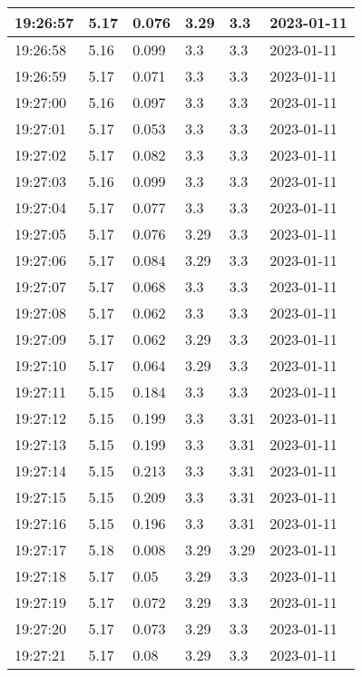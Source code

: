 \begin{longtable}{|l|l|l|l|l|l|}
        19:26:57 & 5.17 & 0.076 & 3.29 & 3.3 & 2023-01-11 \\ \hline
        19:26:58 & 5.16 & 0.099 & 3.3 & 3.3 & 2023-01-11 \\ \hline
        19:26:59 & 5.17 & 0.071 & 3.3 & 3.3 & 2023-01-11 \\ \hline
        19:27:00 & 5.16 & 0.097 & 3.3 & 3.3 & 2023-01-11 \\ \hline
        19:27:01 & 5.17 & 0.053 & 3.3 & 3.3 & 2023-01-11 \\ \hline
        19:27:02 & 5.17 & 0.082 & 3.3 & 3.3 & 2023-01-11 \\ \hline
        19:27:03 & 5.16 & 0.099 & 3.3 & 3.3 & 2023-01-11 \\ \hline
        19:27:04 & 5.17 & 0.077 & 3.3 & 3.3 & 2023-01-11 \\ \hline
        19:27:05 & 5.17 & 0.076 & 3.29 & 3.3 & 2023-01-11 \\ \hline
        19:27:06 & 5.17 & 0.084 & 3.29 & 3.3 & 2023-01-11 \\ \hline
        19:27:07 & 5.17 & 0.068 & 3.3 & 3.3 & 2023-01-11 \\ \hline
        19:27:08 & 5.17 & 0.062 & 3.3 & 3.3 & 2023-01-11 \\ \hline
        19:27:09 & 5.17 & 0.062 & 3.29 & 3.3 & 2023-01-11 \\ \hline
        19:27:10 & 5.17 & 0.064 & 3.29 & 3.3 & 2023-01-11 \\ \hline
        19:27:11 & 5.15 & 0.184 & 3.3 & 3.3 & 2023-01-11 \\ \hline
        19:27:12 & 5.15 & 0.199 & 3.3 & 3.31 & 2023-01-11 \\ \hline
        19:27:13 & 5.15 & 0.199 & 3.3 & 3.31 & 2023-01-11 \\ \hline
        19:27:14 & 5.15 & 0.213 & 3.3 & 3.31 & 2023-01-11 \\ \hline
        19:27:15 & 5.15 & 0.209 & 3.3 & 3.31 & 2023-01-11 \\ \hline
        19:27:16 & 5.15 & 0.196 & 3.3 & 3.31 & 2023-01-11 \\ \hline
        19:27:17 & 5.18 & 0.008 & 3.29 & 3.29 & 2023-01-11 \\ \hline
        19:27:18 & 5.17 & 0.05 & 3.29 & 3.3 & 2023-01-11 \\ \hline
        19:27:19 & 5.17 & 0.072 & 3.29 & 3.3 & 2023-01-11 \\ \hline
        19:27:20 & 5.17 & 0.073 & 3.29 & 3.3 & 2023-01-11 \\ \hline
        19:27:21 & 5.17 & 0.08 & 3.29 & 3.3 & 2023-01-11 \\ \hline

\end{longtable}
